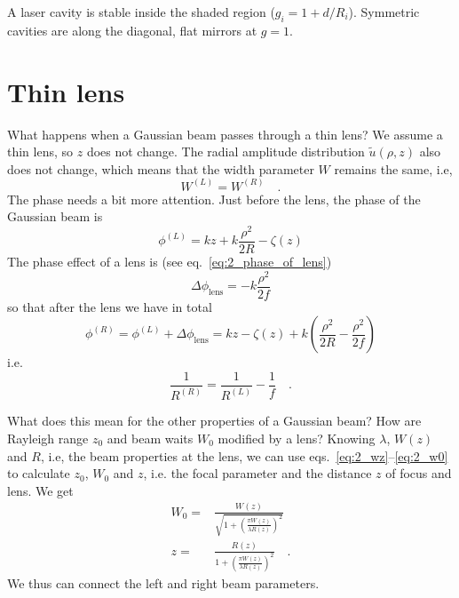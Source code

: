 \begin{marginfigure}
   \caption{A laser cavity is stable inside the shaded region ($g_i = 1 + d/R_i$). Symmetric cavities are along the diagonal, flat mirrors at $g=1$.}
\end{marginfigure}






\section{Thin lens}

What happens when a Gaussian beam passes through a thin lens? We assume a thin lens, so $z$ does not change. The radial amplitude distribution $ \tilde{u}(\rho, z)$ also does not change, which means that the width parameter $W$ remains the same, i.e,
\begin{equation}
    W^{(L)} = W^{(R)} \quad .
\end{equation}
The phase needs a bit more attention. Just before the lens, the phase of the Gaussian beam is
\begin{equation}
   \phi^{(L)} =  k z + k  \frac{\rho^2}{2 R}  -  \zeta(z) 
\end{equation}
The phase effect of a lens is (see eq.~\ref{eq:2_phase_of_lens})
\begin{equation}
  \Delta\phi_\text{lens} =   - k \frac{\rho^2}{2f}
\end{equation}
so that after the lens we have in total
\begin{equation}
  \phi^{(R)} =  \phi^{(L)}   + \Delta\phi_\text{lens}  =   k z   -  \zeta(z)  + k  \left( \frac{\rho^2}{2 R} - \frac{\rho^2}{2f} \right)
\end{equation}  
i.e. 
\begin{equation}
    \frac{1}{R^{(R)}} = \frac{1}{R^{(L)}} - \frac{1}{f} \quad .
\end{equation}

What does this mean for the other properties of a Gaussian beam? How are Rayleigh range $z_0$ and beam waits $W_0$ modified by a lens? Knowing $\lambda$, $W(z)$ and $R$, i.e, the beam properties at the lens, we can use eqs.~\ref{eq:2_wz}--\ref{eq:2_w0}  to calculate $z_0$, $W_0$ and $z$, i.e. the focal parameter and the distance $z$ of focus and lens. We get
\begin{align}
    W_0 = & \frac{W(z)}{\sqrt{1 + \left(\frac{\pi W(z)}{ \lambda R(z)} \right)^2}} \\
    z = & \frac{R(z)}{1 + \left(\frac{\pi W(z)}{ \lambda R(z)} \right)^2} \quad .
\end{align}
We thus can connect the left and right beam parameters.



